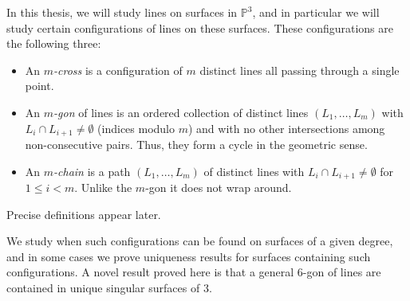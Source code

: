 In this thesis, we will study lines on surfaces in $\mathbb{P}^3$, and in particular we will study certain configurations of lines on these surfaces. These configurations are the following three:
\begin{itemize}
    \item An \emph{$m$-cross} is a configuration of $m$ distinct lines all passing through a single point.
    \item An \emph{$m$-gon} of lines is an ordered collection of distinct lines $(L_1,\dots,L_m)$ with $L_i \cap L_{i+1} \neq \emptyset$ (indices modulo $m$) and with no other intersections among non-consecutive pairs. Thus, they form a cycle in the geometric sense.
    \item An \emph{$m$-chain} is a path $(L_1,\dots,L_m)$ of distinct lines with $L_i \cap L_{i+1}\neq\emptyset$ for $1\le i<m$. Unlike the $m$-gon it does not wrap around.
\end{itemize}
Precise definitions appear later.

We study when such configurations can be found on surfaces of a given degree, and in some cases we prove uniqueness results for surfaces containing such configurations. A novel result proved here is that a general $6$-gon of lines are contained in unique singular surfaces of $3$.


